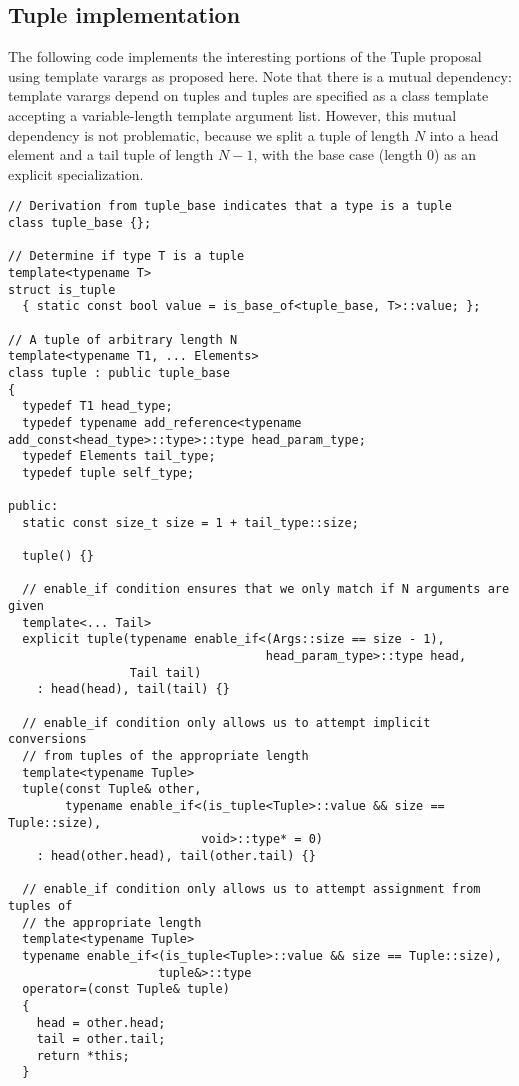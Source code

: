 \documentclass{article}
\begin{document}
\subsection{Tuple implementation}
\label{tupleimpl}
The following code implements the interesting portions of the Tuple
proposal~\cite{Jarvi02} using template varargs as proposed here. Note
that there is a mutual dependency: template varargs depend on tuples
and tuples are specified as a class template accepting a
variable-length template argument list. However, this mutual
dependency is not problematic, because we split a tuple of length $N$
into a head element and a tail tuple of length $N-1$, with the base
case (length $0$) as an explicit specialization.

\small
\begin{verbatim}
// Derivation from tuple_base indicates that a type is a tuple
class tuple_base {};

// Determine if type T is a tuple
template<typename T>
struct is_tuple
  { static const bool value = is_base_of<tuple_base, T>::value; };

// A tuple of arbitrary length N
template<typename T1, ... Elements>
class tuple : public tuple_base 
{
  typedef T1 head_type;
  typedef typename add_reference<typename add_const<head_type>::type>::type head_param_type;
  typedef Elements tail_type;
  typedef tuple self_type;

public:
  static const size_t size = 1 + tail_type::size;

  tuple() {}

  // enable_if condition ensures that we only match if N arguments are given
  template<... Tail> 
  explicit tuple(typename enable_if<(Args::size == size - 1),
                                    head_param_type>::type head,
                 Tail tail)
    : head(head), tail(tail) {}

  // enable_if condition only allows us to attempt implicit conversions
  // from tuples of the appropriate length
  template<typename Tuple>
  tuple(const Tuple& other,
        typename enable_if<(is_tuple<Tuple>::value && size == Tuple::size), 
                           void>::type* = 0)
    : head(other.head), tail(other.tail) {}

  // enable_if condition only allows us to attempt assignment from tuples of
  // the appropriate length
  template<typename Tuple>
  typename enable_if<(is_tuple<Tuple>::value && size == Tuple::size),
                     tuple&>::type
  operator=(const Tuple& tuple)
  {
    head = other.head;
    tail = other.tail;
    return *this;
  }


\end{verbatim}
\end{document}
